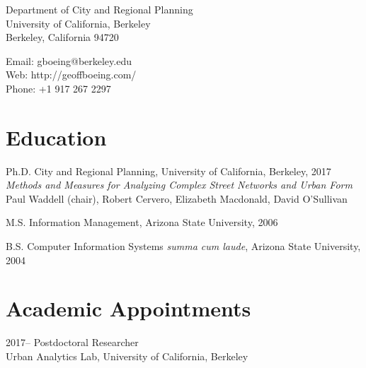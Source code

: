 \documentclass{academiccv}
\begin{document}
\raggedright

\namefont{\myname}

\vspace{1em}
\begin{minipage}[t]{0.495\textwidth}
  Department of City and Regional Planning \\
  University of California, Berkeley \\
  Berkeley, California 94720
\end{minipage}
\begin{minipage}[t]{0.495\textwidth}
  Email: gboeing@berkeley.edu \\
  Web: http://geoffboeing.com/ \\
  Phone: +1 917 267 2297
\end{minipage}
\vspace{0.5em}



\section*{Education}

\begin{tablist}
\item[Ph.D.] \tab City and Regional Planning, University of California, Berkeley, 2017 \\
                  \emph{Methods and Measures for Analyzing Complex Street Networks and Urban Form} \\
                  Paul Waddell (chair), Robert Cervero, Elizabeth Macdonald, David O'Sullivan
\item[M.S.]  \tab Information Management, Arizona State University, 2006
\item[B.S.]  \tab Computer Information Systems \emph{summa cum laude}, Arizona State University, 2004
\end{tablist}



\section*{Academic Appointments}
\begin{tablist}
	\item[2017--] \tab Postdoctoral Researcher \\
	Urban Analytics Lab, University of California, Berkeley
\end{tablist}
\end{document}
